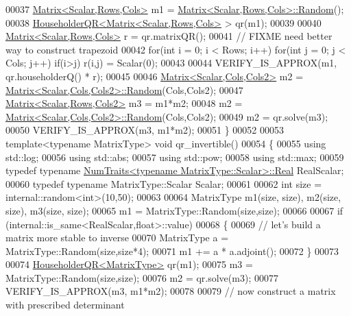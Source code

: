 \begin{DoxyCode}
00037   \hyperlink{group___core___module_class_eigen_1_1_matrix}{Matrix<Scalar,Rows,Cols>} m1 = 
      \hyperlink{group___core___module_class_eigen_1_1_matrix}{Matrix<Scalar,Rows,Cols>::Random}();
00038   \hyperlink{group___q_r___module_class_eigen_1_1_householder_q_r}{HouseholderQR<Matrix<Scalar,Rows,Cols>} > qr(m1);
00039 
00040   \hyperlink{group___core___module_class_eigen_1_1_matrix}{Matrix<Scalar,Rows,Cols>} r = qr.matrixQR();
00041   \textcolor{comment}{// FIXME need better way to construct trapezoid}
00042   \textcolor{keywordflow}{for}(\textcolor{keywordtype}{int} i = 0; i < Rows; i++) for(int j = 0; j < Cols; j++) if(i>j) r(i,j) = Scalar(0);
00043 
00044   VERIFY\_IS\_APPROX(m1, qr.householderQ() * r);
00045 
00046   \hyperlink{group___core___module_class_eigen_1_1_matrix}{Matrix<Scalar,Cols,Cols2>} m2 = 
      \hyperlink{group___core___module_class_eigen_1_1_matrix}{Matrix<Scalar,Cols,Cols2>::Random}(Cols,Cols2);
00047   \hyperlink{group___core___module_class_eigen_1_1_matrix}{Matrix<Scalar,Rows,Cols2>} m3 = m1*m2;
00048   m2 = \hyperlink{group___core___module_class_eigen_1_1_matrix}{Matrix<Scalar,Cols,Cols2>::Random}(Cols,Cols2);
00049   m2 = qr.solve(m3);
00050   VERIFY\_IS\_APPROX(m3, m1*m2);
00051 \}
00052 
00053 \textcolor{keyword}{template}<\textcolor{keyword}{typename} MatrixType> \textcolor{keywordtype}{void} qr\_invertible()
00054 \{
00055   \textcolor{keyword}{using} std::log;
00056   \textcolor{keyword}{using} std::abs;
00057   \textcolor{keyword}{using} std::pow;
00058   \textcolor{keyword}{using} std::max;
00059   \textcolor{keyword}{typedef} \textcolor{keyword}{typename} \hyperlink{group___core___module_struct_eigen_1_1_num_traits}{NumTraits<typename MatrixType::Scalar>::Real}
       RealScalar;
00060   \textcolor{keyword}{typedef} \textcolor{keyword}{typename} MatrixType::Scalar Scalar;
00061 
00062   \textcolor{keywordtype}{int} size = internal::random<int>(10,50);
00063 
00064   MatrixType m1(size, size), m2(size, size), m3(size, size);
00065   m1 = MatrixType::Random(size,size);
00066 
00067   \textcolor{keywordflow}{if} (internal::is\_same<RealScalar,float>::value)
00068   \{
00069     \textcolor{comment}{// let's build a matrix more stable to inverse}
00070     MatrixType a = MatrixType::Random(size,size*4);
00071     m1 += a * a.adjoint();
00072   \}
00073 
00074   \hyperlink{group___q_r___module}{HouseholderQR<MatrixType>} qr(m1);
00075   m3 = MatrixType::Random(size,size);
00076   m2 = qr.solve(m3);
00077   VERIFY\_IS\_APPROX(m3, m1*m2);
00078 
00079   \textcolor{comment}{// now construct a matrix with prescribed determinant}

\end{DoxyCode}
